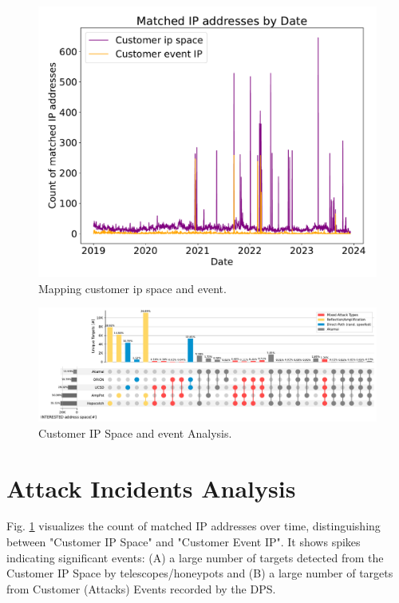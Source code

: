 \begin{figure}[htbp]
    \centering
    \includegraphics[scale=0.30]{graphs/matched_customer_graph.pdf}
    \caption{Mapping customer ip space and event.}
    \label{fig:mappedcustomergraph}
\end{figure}

\begin{figure}[htbp]
    \centering
    \includegraphics[scale=0.48]{graphs/noir3.pdf}
    \caption{Customer IP Space and event Analysis.}
    \label{fig:Mappedaddressanalysis}
\end{figure}

\section{Attack Incidents Analysis}\label{sec:attackeventsfromcustomeripspace}
Fig. \ref{fig:mappedcustomergraph} visualizes the count of matched IP addresses over time, distinguishing between "Customer IP Space" and "Customer Event IP". It shows spikes indicating significant events: (A) a large number of targets detected from the Customer IP Space by telescopes/honeypots and (B) a large number of targets from Customer (Attacks) Events recorded by the DPS.

